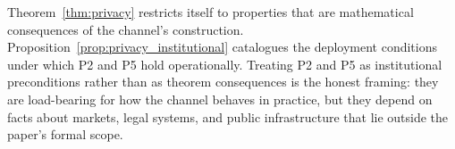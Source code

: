 \begin{remark}
\label{rem:privacy_mixed_status}
Theorem~\ref{thm:privacy} restricts itself to properties that are
mathematical consequences of the channel's construction.
Proposition~\ref{prop:privacy_institutional} catalogues the
deployment conditions under which P2 and P5 hold operationally.
Treating P2 and P5 as institutional preconditions rather than as
theorem consequences is the honest framing: they are load-bearing
for how the channel behaves in practice, but they depend on facts
about markets, legal systems, and public infrastructure that lie
outside the paper's formal scope.
\end{remark}
